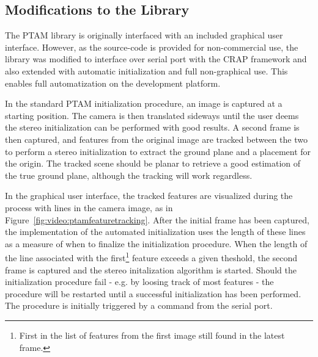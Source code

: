         \subsection{Modifications to the Library}
            The PTAM library is originally interfaced with an included graphical user interface.
            However, as the source-code is provided for non-commercial use, the
            library was modified to interface over serial port with the CRAP framework
            and also extended with automatic initialization and full non-graphical use.
            This enables full automatization on the development platform.

            In the standard PTAM initialization procedure, an image is captured
            at a starting position. The camera is then translated sideways until the user
            deems the stereo initialization can be performed with good results.
            A second frame is then captured, and features from the original image
            are tracked between the two to perform a stereo initialization to
            extract the ground plane and a placement for the origin.
            The tracked scene should be planar to retrieve a good estimation
            of the true ground plane, although the tracking will work regardless.


            In the graphical user interface, the tracked features are visualized
            during the process with lines in the camera image, as in Figure~\ref{fig:video:ptamfeaturetracking}.
            After the initial frame has been captured, the implementation
            of the automated initialization uses the length of these lines as
            a measure of when to finalize the initialization procedure.
            When the length of the line associated with the first\footnote{First in the list of features from the first image still found in the latest frame.}
            feature exceeds a given theshold, the second frame is
            captured and the stereo initalization algorithm is started.
            Should the initialization procedure fail - e.g. by loosing track of most features - the
            procedure will be restarted until a successful initialization has been performed.
            The procedure is initially triggered by a command from the serial port.

